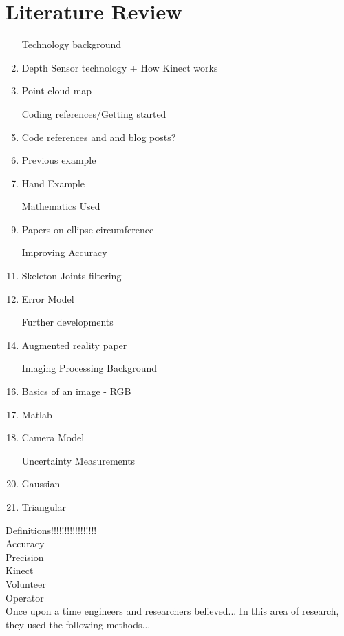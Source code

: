 \chapter{Literature Review}

\begin{enumerate}
	\item [Technology] background 
	\item Depth Sensor technology + How Kinect works
	\item Point cloud map
	
	\item [Coding] references/Getting started
	\item Code references and and blog posts? 
	\item Previous example
	\item Hand Example
	
	\item [Mathematics] Used
	\item Papers on ellipse circumference
	
	\item [Improving] Accuracy
	\item Skeleton Joints filtering
	\item Error Model
	
	\item [Further] developments
	\item Augmented reality paper
	
	\item [Imaging] Processing Background
	\item Basics of an image - RGB
	\item Matlab
	\item Camera Model
	
	\item [Uncertainty] Measurements
	\item Gaussian 
	\item Triangular
\end{enumerate}

Definitions!!!!!!!!!!!!!!!!!\\
Accuracy\\
Precision\\
Kinect\\
Volunteer\\
Operator\\

Once upon a time engineers and researchers believed... In this area of research, they used the following methods... \cite{jct2010}

